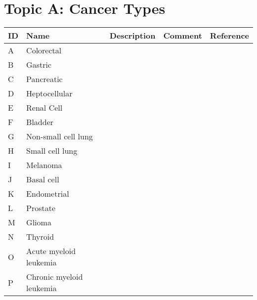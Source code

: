 
\section{Topic A: Cancer Types}

\begin{table}[H]\centering
\begin{tabular}{p{1cm}p{2cm}p{3cm}p{3cm}p{1cm}}
ID & Name & Description & Comment & Reference \\
\hline
A & Colorectal & & & \\
B & Gastric  & & & \\
C & Pancreatic  & & & \\
D & Heptocellular  & & & \\
E & Renal Cell  & & & \\
F & Bladder  & & & \\
G & Non-small cell lung  & & & \\
H & Small cell lung  & & & \\
I & Melanoma  & & & \\
J & Basal cell  & & & \\
K & Endometrial  & & & \\
L & Prostate  & & & \\
M & Glioma  & & & \\
N & Thyroid  & & & \\
O & Acute myeloid leukemia  & & & \\
P & Chronic myeloid leukemia  & & & \\
\hline
\end{tabular}
\end{table}
